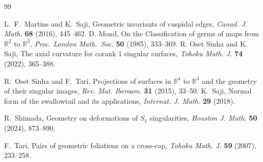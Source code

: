 \documentclass[12pt]{amsart}
\theoremstyle{plain}
\theoremstyle{definition}
\newcommand{\R}{\mathbb{R}}
\begin{document}
\begin{thebibliography}{99}

{\sc L.~F.~Martins} and {\sc K.~Saji},
Geometric invariants of cuspidal edges,
\textit{Canad. J. Math.} \textbf{68} (2016), 445--462.
{\sc D. Mond},
On the Classification of germs of maps from $\R^2$ to $\R^3$,
{\it Proc. London Math.\ Soc.} {\bf 50} (1985), 333--369.
{\sc R. Oset Sinha} and {\sc K. Saji}, 
The axial curvature for corank 1 singular surfaces, 
\textit{Tohoku Math. J.} \textbf{74} (2022), 365--388.

{\sc R.~Oset Sinha and F.~Tari},
Projections of surfaces in $\mathbb{R}^4$ to $\mathbb{R}^3$ and the geometry of their singular images,
\textit{Rev. Mat. Iberoam.} \textbf{31} (2015), 33--50.
{\sc K.~Saji}, 
Normal form of the swallowtail and its applications, 
\textit{Internat. J. Math.} \textbf{29} (2018).

{\sc R.~Shimada},
Geometry on deformations of $S_1$ singularities,
\textit{Houston J. Math.} \textbf{50} (2024), 873--890.

{\sc F.~Tari},
Pairs of geometric foliations on a cross-cap,
{\it Tohoku Math. J.} {\bf 59} (2007), 233--258.


\end{thebibliography}
\end{document}
